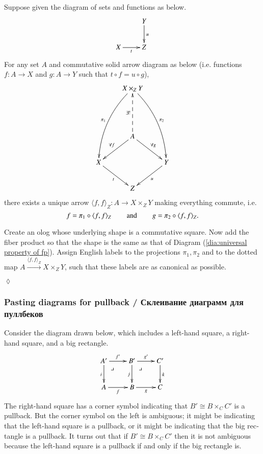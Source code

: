 \documentclass{book}
\makeatletter
\def\hsp{\hspace{.3in}}
\def\to{\rightarrow}
\def\taking{\colon}
\def\iso{\cong}
\def\la{\langle}
\def\ra{\rangle}
\def\ullimit{\ar@{}[rd]|(.3)*+{\lrcorner}}
\newcommand{\To}[1]{\xrightarrow{#1}}
\newcommand{\prodmap}[2]{\la#1,#2\ra}
\newcommand{\pb}[3]{\prodmap{#1}{#1}_{#3}}
\theoremstyle{theoremENG}
\theoremstyle{lemmaENG}
\newtheorem{lemmaENG}[subsubsection]{\begin{english}Lemma\end{english}}
\theoremstyle{propositionENG}
\theoremstyle{corollaryENG}
\theoremstyle{factENG}
\theoremstyle{remarkENG}
\theoremstyle{exampleENG}
\theoremstyle{warningENG}
\theoremstyle{questionENG}
\theoremstyle{guessENG}
\theoremstyle{answerENG}
\theoremstyle{constructionENG}
\theoremstyle{rulesENG}
\theoremstyle{excENG}
\newtheorem{excENG}[subsubsection]{\begin{english}Exercise\end{english}}
\theoremstyle{appENG}
\theoremstyle{definitionENG}
\theoremstyle{notationENG}
\theoremstyle{conjectureENG}
\theoremstyle{postulateENG}
\newenvironment{exerciseENG}{\begin{excENG}}{\hspace*{\fill}$\lozenge$\end{excENG}}
\theoremstyle{theoremRUS}
\theoremstyle{lemmaRUS}
\theoremstyle{propositionRUS}
\theoremstyle{corollaryRUS}
\theoremstyle{factRUS}
\theoremstyle{remarkRUS}
\theoremstyle{exampleRUS}
\theoremstyle{warningRUS}
\theoremstyle{questionRUS}
\theoremstyle{guessRUS}
\theoremstyle{answerRUS}
\theoremstyle{constructionRUS}
\theoremstyle{rulesRUS}
\theoremstyle{excRUS}
\theoremstyle{appRUS}
\theoremstyle{definitionRUS}
\theoremstyle{notationRUS}
\theoremstyle{conjectureRUS}
\theoremstyle{postulateRUS}
\makeatother
\begin{document}
\begin{english}
\begin{lemmaENG}
Suppose given the diagram of sets and functions as below.
\begin{align*}
\xymatrix{&Y\ar[d]^u\\
X\ar[r]_t&Z}
\end{align*}
For any set $A$ and commutative solid arrow diagram as below (i.e. functions $f\taking A\to X$ and $g\taking A\to Y$ such that $t\circ f=u\circ g$), 
\begin{align}\label{dia:universal property of fp}
\xymatrix{
&X\times_ZY\ar@/_1pc/[lddd]_{\pi_1}\ar@/^1pc/[rddd]^{\pi_2}\\\\
&A\ar@{-->}[uu]^{\exists!}\ar[dl]_{\forall f}\ar[dr]^{\forall g}&\\
X\ar[rd]_t&&Y\ar[ld]^u\\
&Z&}
\end{align}
there exists a unique arrow $\pb{f}{g}{Z}\taking A\to X\times_ZY$ making everything commute, i.e. 
$$f=\pi_1\circ \pb{f}{g}{Z}\hsp\text{and}\hsp g=\pi_2\circ\pb{f}{g}{Z}.$$

\begin{russian} \end{russian}

\end{lemmaENG}

\begin{exerciseENG}

Create an olog whose underlying shape is a commutative square. Now add the fiber product so that the shape is the same as that of Diagram (\ref{dia:universal property of fp}). Assign English labels to the projections $\pi_1,\pi_2$ and to the dotted map $A\To{\pb{f}{g}{Z}}X\times_ZY$, such that these labels are as canonical as possible.

\begin{russian} \end{russian}

\end{exerciseENG}


\subsubsection{Pasting diagrams for pullback / Склеивание диаграмм для пуллбеков}

Consider the diagram drawn below, which includes a left-hand square, a right-hand square, and a big rectangle.
$$
\xymatrix{
A'\ar[r]^{f'}\ar[d]_i\ullimit&B'\ar[r]^{g'}\ar[d]_j\ullimit&C'\ar[d]^k\\
A\ar[r]_f&B\ar[r]_g&C}
$$
The right-hand square has a corner symbol indicating that $B'\iso B\times_CC'$ is a pullback. But the corner symbol on the left is ambiguous; it might be indicating that the left-hand square is a pullback, or it might be indicating that the big rectangle is a pullback. It turns out that if $B'\iso B\times_CC'$ then it is not ambiguous because the left-hand square is a pullback if and only if the big rectangle is.


\end{english}
\end{document}
